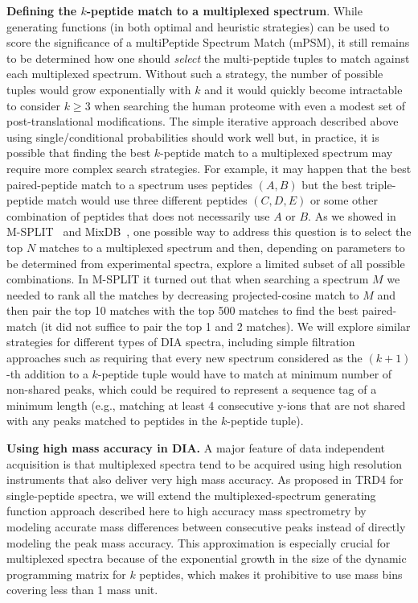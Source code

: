 \documentclass[arial,11pt]{article}
\begin{document}
{\bf Defining the $k$-peptide match to a multiplexed spectrum}. While generating functions (in both optimal and heuristic strategies) can be used to score the significance of a multiPeptide Spectrum Match (mPSM), it still remains to be determined how one should {\em select} the multi-peptide tuples to match against each multiplexed spectrum. Without such a strategy, the number of possible tuples would grow exponentially with $k$ and it would quickly become intractable to consider $k\geq 3$ when searching the human proteome with even a modest set of post-translational modifications. The simple iterative approach described above using single/conditional probabilities should work well but, in practice, it is possible that finding the best $k$-peptide match to a multiplexed spectrum may require more complex search strategies. For example, it may happen that the best paired-peptide match to a spectrum uses peptides $(A,B)$ but the best triple-peptide match would use three different peptides $(C,D,E)$ or some other combination of peptides that does not necessarily use $A$ or $B$. As we showed in M-SPLIT~\cite{wang2010msplit} and MixDB~\cite{wang2011peptide}, one possible way to address this question is to select the top $N$ matches to a multiplexed spectrum and then, depending on parameters to be determined from experimental spectra, explore a limited subset of all possible combinations. In M-SPLIT it turned out that when searching a spectrum $M$ we needed to rank all the matches by decreasing projected-cosine match to $M$ and then pair the top 10 matches with the top 500 matches to find the best paired-match (it did not suffice to pair the top 1 and 2 matches). We will explore similar strategies for different types of DIA spectra, including simple filtration approaches such as requiring that every new spectrum considered as the $(k+1)$-th addition to a $k$-peptide tuple would have to match at minimum number of non-shared peaks, which could be required to represent a sequence tag of a minimum length (e.g., matching at least 4 consecutive y-ions that are not shared with any peaks matched to peptides in the $k$-peptide tuple).

{\bf Using high mass accuracy in DIA.} A major feature of data independent acquisition is that multiplexed spectra tend to be acquired using high resolution instruments that also deliver very high mass accuracy. As proposed in TRD4 for single-peptide spectra, we will extend the multiplexed-spectrum generating function approach described here to high accuracy mass spectrometry by modeling accurate mass differences between consecutive peaks instead of directly modeling the peak mass accuracy. This approximation is especially crucial for multiplexed spectra because of the exponential growth in the size of the dynamic programming matrix for $k$ peptides, which makes it prohibitive to use mass bins covering less than 1 mass unit.
\end{document}
